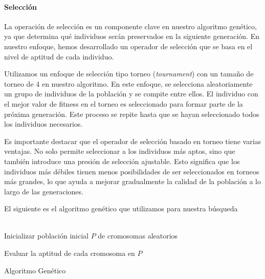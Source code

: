 \paragraph{Selección}
La operación de selección es un componente clave en nuestro algoritmo genético, ya que determina qué individuos serán preservados en la siguiente generación. En nuestro enfoque, hemos desarrollado un operador de selección que se basa en el nivel de aptitud de cada individuo.

Utilizamos un enfoque de selección tipo torneo (\emph{tournament}) con un tamaño de torneo de 4 en nuestro algoritmo. En este enfoque, se selecciona aleatoriamente un grupo de individuos de la población y se compite entre ellos. El individuo con el mejor valor de fitness en el torneo es seleccionado para formar parte de la próxima generación. Este proceso se repite hasta que se hayan seleccionado todos los individuos necesarios.

Es importante destacar que el operador de selección basado en torneo tiene varias ventajas. No solo permite seleccionar a los individuos más aptos, sino que también introduce una presión de selección ajustable. Esto significa que los individuos más débiles tienen menos posibilidades de ser seleccionados en torneos más grandes, lo que ayuda a mejorar gradualmente la calidad de la población a lo largo de las generaciones.


El siguiente es el algoritmo genético que utilizamos para nuestra búsqueda
\\
\\
\begin{algorithm}[H]

\SetAlgoLined
{}
Inicializar población inicial $P$ de cromosomas aleatorios\;

Evaluar la aptitud de cada cromosoma en $P$\;

\caption{Algoritmo Genético}
\end{algorithm}



